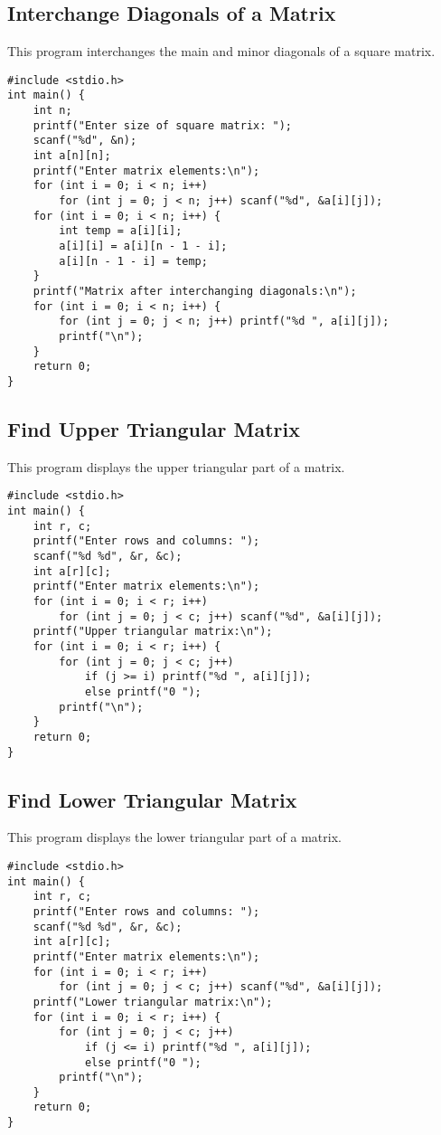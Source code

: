 \documentclass[a4paper,12pt]{article}
\begin{document}
\subsection{Interchange Diagonals of a Matrix}
This program interchanges the main and minor diagonals of a square matrix.
\begin{lstlisting}[caption={Interchange Diagonals of a Matrix}]
#include <stdio.h>
int main() {
    int n;
    printf("Enter size of square matrix: ");
    scanf("%d", &n);
    int a[n][n];
    printf("Enter matrix elements:\n");
    for (int i = 0; i < n; i++)
        for (int j = 0; j < n; j++) scanf("%d", &a[i][j]);
    for (int i = 0; i < n; i++) {
        int temp = a[i][i];
        a[i][i] = a[i][n - 1 - i];
        a[i][n - 1 - i] = temp;
    }
    printf("Matrix after interchanging diagonals:\n");
    for (int i = 0; i < n; i++) {
        for (int j = 0; j < n; j++) printf("%d ", a[i][j]);
        printf("\n");
    }
    return 0;
}
\end{lstlisting}
\clearpage

\subsection{Find Upper Triangular Matrix}
This program displays the upper triangular part of a matrix.
\begin{lstlisting}[caption={Find Upper Triangular Matrix}]
#include <stdio.h>
int main() {
    int r, c;
    printf("Enter rows and columns: ");
    scanf("%d %d", &r, &c);
    int a[r][c];
    printf("Enter matrix elements:\n");
    for (int i = 0; i < r; i++)
        for (int j = 0; j < c; j++) scanf("%d", &a[i][j]);
    printf("Upper triangular matrix:\n");
    for (int i = 0; i < r; i++) {
        for (int j = 0; j < c; j++)
            if (j >= i) printf("%d ", a[i][j]);
            else printf("0 ");
        printf("\n");
    }
    return 0;
}
\end{lstlisting}
\clearpage

\subsection{Find Lower Triangular Matrix}
This program displays the lower triangular part of a matrix.
\begin{lstlisting}[caption={Find Lower Triangular Matrix}]
#include <stdio.h>
int main() {
    int r, c;
    printf("Enter rows and columns: ");
    scanf("%d %d", &r, &c);
    int a[r][c];
    printf("Enter matrix elements:\n");
    for (int i = 0; i < r; i++)
        for (int j = 0; j < c; j++) scanf("%d", &a[i][j]);
    printf("Lower triangular matrix:\n");
    for (int i = 0; i < r; i++) {
        for (int j = 0; j < c; j++)
            if (j <= i) printf("%d ", a[i][j]);
            else printf("0 ");
        printf("\n");
    }
    return 0;
}
\end{lstlisting}
\clearpage
\end{document}
